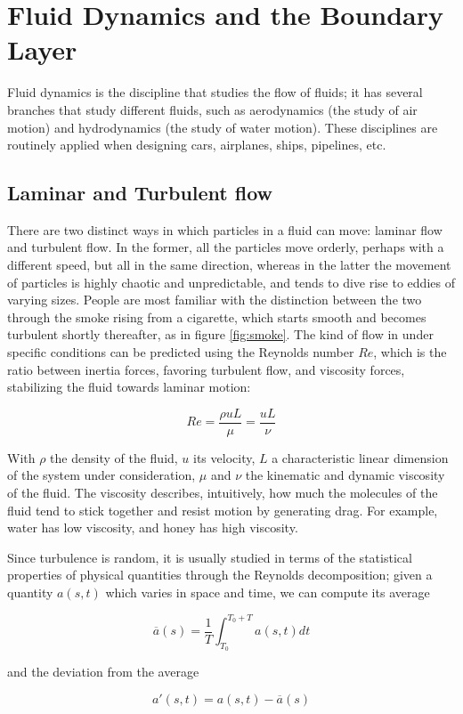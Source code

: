 \documentclass[12pt]{book}
\begin{document}
\section{Fluid Dynamics and the Boundary Layer}
Fluid dynamics is the discipline that studies the flow of fluids; it has several branches that study different fluids, such as aerodynamics (the study of air motion) and hydrodynamics (the study of water motion). These disciplines are routinely applied when designing cars, airplanes, ships, pipelines, etc.

\subsection{Laminar and Turbulent flow}
There are two distinct ways in which particles in a fluid can move: laminar flow and turbulent flow. In the former, all the particles move orderly, perhaps with a different speed, but all in the same direction, whereas in the latter the movement of particles is highly chaotic and unpredictable, and tends to dive rise to eddies of varying sizes. People are most familiar with the distinction between the two through the smoke rising from a cigarette, which starts smooth and becomes turbulent shortly thereafter, as in figure \ref{fig:smoke}. The kind of flow in under specific conditions can be predicted using the Reynolds number $Re$, which is the ratio between inertia forces, favoring turbulent flow, and viscosity forces, stabilizing the fluid towards laminar motion:

$$
Re=\frac{\rho u L}{\mu}=\frac{uL}{\nu}
$$

With $\rho$ the density of the fluid, $u$ its velocity, $L$ a characteristic linear dimension of the system under consideration, $\mu$ and $\nu$ the kinematic and dynamic viscosity of the fluid. The viscosity describes, intuitively, how much the molecules of the fluid tend to stick together and resist motion by generating drag. For example, water has low viscosity, and honey has high viscosity.

Since turbulence is random, it is usually studied in terms of the statistical properties of physical quantities through the Reynolds decomposition; given a quantity $a(s,t)$ which varies in space and time, we can compute its average

$$
\overline{a}(s)=\frac{1}{T}\int_{T_0}^{T_0+T}a(s,t)dt
$$

and the deviation from the average

$$
a'(s,t)=a(s,t)-\overline{a}(s)
$$
\end{document}
